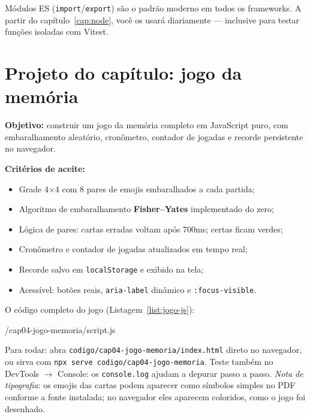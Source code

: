 \begin{caixadica}
Módulos ES (\texttt{import}/\texttt{export}) são o padrão moderno em todos os
frameworks. A partir do capítulo~\ref{cap:node}, você os usará diariamente —
inclusive para testar funções isoladas com Vitest.
\end{caixadica}

\section{Projeto do capítulo: jogo da memória}
\label{sec:projeto4}

\begin{caixaprojeto}
\textbf{Objetivo:} construir um jogo da memória completo em JavaScript puro,
com embaralhamento aleatório, cronômetro, contador de jogadas e recorde
persistente no navegador.

\textbf{Critérios de aceite:}
\begin{itemize}[leftmargin=*, itemsep=0.2em]
  \item Grade 4×4 com 8 pares de emojis embaralhados a cada partida;
  \item Algoritmo de embaralhamento \textbf{Fisher--Yates} implementado do zero;
  \item Lógica de pares: cartas erradas voltam após 700ms; certas ficam verdes;
  \item Cronômetro e contador de jogadas atualizados em tempo real;
  \item Recorde salvo em \texttt{localStorage} e exibido na tela;
  \item Acessível: botões reais, \texttt{aria-label} dinâmico e \texttt{:focus-visible}.
\end{itemize}
\end{caixaprojeto}

O código completo do jogo (Listagem~\ref{list:jogo-js}):


  {\codigopath/cap04-jogo-memoria/script.js}

\begin{caixadica}
Para rodar: abra \texttt{codigo/cap04-jogo-memoria/index.html} direto no
navegador, ou sirva com \texttt{npx serve codigo/cap04-jogo-memoria}.
Teste também no DevTools $\rightarrow$ Console: os \texttt{console.log} ajudam
a depurar passo a passo. \emph{Nota de tipografia}: os emojis das cartas
podem aparecer como símbolos simples no PDF conforme a fonte instalada;
no navegador eles aparecem coloridos, como o jogo foi desenhado.
\end{caixadica}

